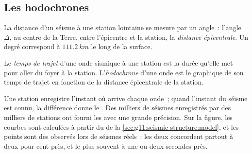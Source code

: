 \subsection{Les hodochrones}

La distance d'un séisme à une station lointaine se mesure par un angle~:
l'angle $\Delta$, au centre de la Terre, entre l'épicentre et la station,
la \emph{distance épicentrale}.
Un degré correspond à $\qty{111.2}{km}$ le long de la
surface.

\begin{definition}\label{def:g11:seismic-structure:travel-time}
Le \emph{temps de trajet} d'une onde sismique à une
station est la durée qu'elle met pour aller du foyer à la station.
L'\emph{hodochrone} d'une onde est le graphique de son
temps de trajet en fonction de la distance épicentrale de la station.
\end{definition}

Une station enregistre l'instant où arrive chaque onde~; quand l'instant du
séisme est connu, la différence donne le . Des milliers de
séismes enregistrés par des milliers de stations ont fourni les 
avec une grande précision. Sur la figure, les courbes sont calculées à
partir du  de la
\cref{sec:g11:seismic-structure:model}, et les points sont des  observés lors de séismes réels~: les deux concordent partout à deux
pour cent près, et le plus souvent à une ou deux secondes près.

